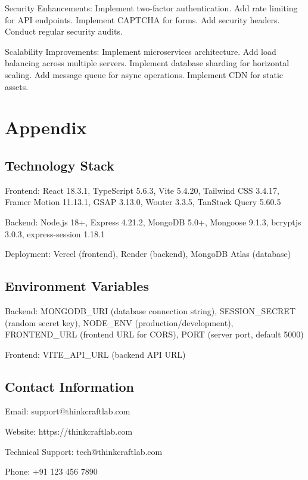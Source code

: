 ﻿\documentclass[11pt]{article}
\begin{document}
Security Enhancements: Implement two-factor authentication. Add rate limiting for API endpoints. Implement CAPTCHA for forms. Add security headers. Conduct regular security audits.

Scalability Improvements: Implement microservices architecture. Add load balancing across multiple servers. Implement database sharding for horizontal scaling. Add message queue for async operations. Implement CDN for static assets.

\section{Appendix}

\subsection{Technology Stack}
Frontend: React 18.3.1, TypeScript 5.6.3, Vite 5.4.20, Tailwind CSS 3.4.17, Framer Motion 11.13.1, GSAP 3.13.0, Wouter 3.3.5, TanStack Query 5.60.5

Backend: Node.js 18+, Express 4.21.2, MongoDB 5.0+, Mongoose 9.1.3, bcryptjs 3.0.3, express-session 1.18.1

Deployment: Vercel (frontend), Render (backend), MongoDB Atlas (database)

\subsection{Environment Variables}
Backend: MONGODB\_URI (database connection string), SESSION\_SECRET (random secret key), NODE\_ENV (production/development), FRONTEND\_URL (frontend URL for CORS), PORT (server port, default 5000)

Frontend: VITE\_API\_URL (backend API URL)

\subsection{Contact Information}
Email: support@thinkcraftlab.com

Website: https://thinkcraftlab.com

Technical Support: tech@thinkcraftlab.com

Phone: +91 123 456 7890
\end{document}
